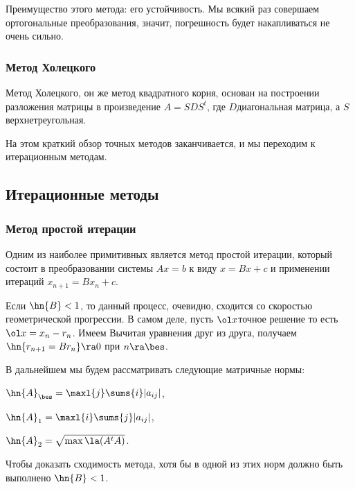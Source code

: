 \documentclass[a4paper]{article}
\begin{document}
Преимущество этого метода: его устойчивость. Мы всякий раз совершаем ортогональные преобразования,
значит, погрешность будет накапливаться не очень сильно.

\subsubsection{Метод Холецкого}

Метод Холецкого, он же метод квадратного корня, основан на построении разложения
матрицы в произведение $A = S D S^t$, где $D$\т диагональная матрица, а $S$\т верхнетреугольная.


На этом краткий обзор точных методов заканчивается, и мы переходим к итерационным методам.

\subsection{Итерационные методы}

\subsubsection{Метод простой итерации}

Одним из наиболее примитивных является метод простой итерации, который состоит в преобразовании системы $Ax=b$ к виду
$x = Bx +c$ и применении итераций $x_{n+1} = Bx_n+c$.

Если $\hn{B} <1$, то данный процесс, очевидно, сходится со скоростью геометрической прогрессии. В самом деле,
пусть $\ol x$\т точное решение то есть $\ol x = x_n -r_n$. Имеем
Вычитая уравнения друг из друга, получаем
$\hn{r_{n+1} = B r_n} \ra 0$ при $n\ra \bes$.


В дальнейшем мы будем рассматривать следующие матричные нормы:
\begin{items}{-2}
\item $\hn{A}_\bes = \maxl{j}\sums{i}|a_{ij}|$,
\item $\hn{A}_1 = \maxl{i}\sums{j}|a_{ij}|$,
\item $\hn{A}_2 = \sqrt{\max \la(A^tA)}$.
\end{items}

Чтобы доказать сходимость метода, хотя бы в одной из этих норм должно быть выполнено $\hn{B} < 1$.
\end{document}

